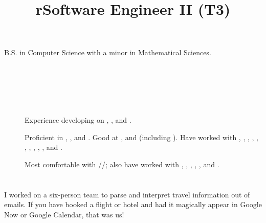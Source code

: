 \begin{resume}


\section{}

B.S. in Computer Science with a minor in Mathematical Sciences.


\begin{formatb}
  \title{r}\\
  \\
  \body\\
\end{formatb}


\section{}
\begin{description}
\item[]
Experience developing on , ,  and .
\item[]
Proficient in , ,  and \kw{\Cplusplus}.
Good at ,  and  (including
).
Have worked with \kw{\LaTeX}, , ,
\kw{\CSharp}, , , , , ,
,  and .

\item[]
Most comfortable with //;
also have worked with , , ,
, ,  and .

\end{description}

\section{}

\title{Software Engineer II (T3)}
\begin{position}
I worked on a six-person team to parse and interpret travel information out of
emails. If you have booked a flight or hotel and had it magically appear in
Google Now or Google Calendar, that was us!


\end{position}
\end{resume}
